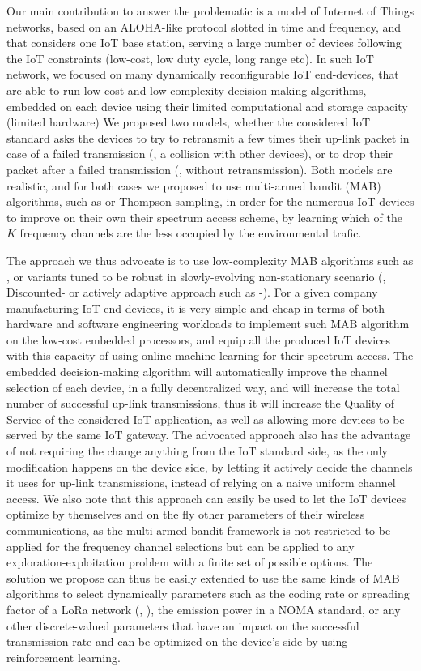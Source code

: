 Our main contribution to answer the problematic is a model of Internet of Things networks, based on an ALOHA-like protocol slotted in time and frequency, and that considers one IoT base station, serving a large number of devices following the IoT constraints (low-cost, low duty cycle, long range etc).
In such IoT network, we focused on many dynamically reconfigurable IoT end-devices, that are able to run low-cost and low-complexity decision making algorithms, embedded on each device using their limited computational and storage capacity (limited hardware)
We proposed two models, whether the considered IoT standard asks the devices to try to retransmit a few times their up-link packet in case of a failed transmission (\ie, a collision with other devices),
or to drop their packet after a failed transmission (\ie, without retransmission).
Both models are realistic, and for both cases we proposed to use multi-armed bandit (MAB) algorithms, such as \UCB{} or Thompson sampling, in order for the numerous IoT devices to improve on their own their spectrum access scheme, by learning which of the $K$ frequency channels are the less occupied by the environmental trafic.

The approach we thus advocate is to use low-complexity MAB algorithms such as \UCB, or variants tuned to be robust in slowly-evolving non-stationary scenario (\eg, Discounted-\UCB{} or actively adaptive approach such as \GLR-\klUCB).
For a given company manufacturing IoT end-devices, it is very simple and cheap in terms of both hardware and software engineering workloads to implement such MAB algorithm on the low-cost embedded processors, and equip all the produced IoT devices with this capacity of using online machine-learning for their spectrum access.
The embedded decision-making algorithm will automatically improve the channel selection of each device, in a fully decentralized way, and will increase the total number of successful up-link transmissions, thus it will increase the Quality of Service of the considered IoT application, as well as allowing more devices to be served by the same IoT gateway.
%
The advocated approach also has the advantage of not requiring the change anything from the IoT standard side, as the only modification happens on the device side, by letting it actively decide the channels it uses for up-link transmissions, instead of relying on a naive uniform channel access.
%
We also note that this approach can easily be used to let the IoT devices optimize by themselves and on the fly other parameters of their wireless communications, as the multi-armed bandit framework is not restricted to be applied for the frequency channel selections but can be applied to any exploration-exploitation problem with a finite set of possible options.
The solution we propose can thus be easily extended to use the same kinds of MAB algorithms to select dynamically parameters such as the coding rate or spreading factor of a LoRa network (\eg, \cite{KerkoucheAlami18}), the emission power in a NOMA standard, or any other discrete-valued parameters that have an impact on the successful transmission rate and can be optimized on the device's side by using reinforcement learning.


